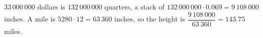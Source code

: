 $33\,000\,000$ dollars is $132\,000\,000$ quarters, a stack of $132\,000\,000\cdot0.069=9\,108\,000$ inches. A mile is $5280\cdot12=63\,360$ inches, so the height is $\dfrac{9\,108\,000}{63\,360}=\boxed{143.75}$ miles.
